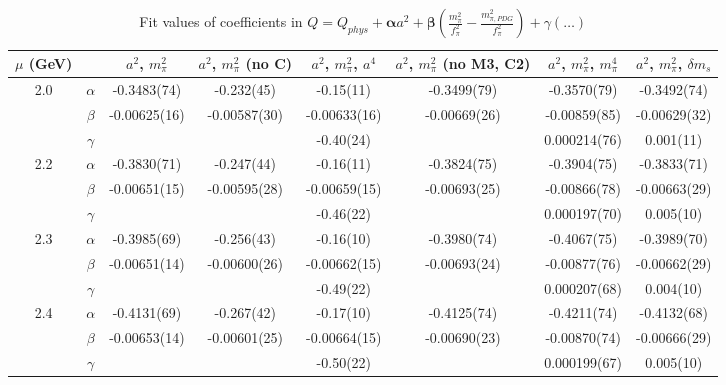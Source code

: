\documentclass[12pt]{extarticle}
\begin{document}
\begin{table}[h!]
\begin{center}
\begin{tabular}{|c c|c|c|c|c|c|c|}
\hline
$\mu$ (GeV) &  & $a^2$, $m_\pi^2$& $a^2$, $m_\pi^2$ (no C)& $a^2$, $m_\pi^2$, $a^4$& $a^2$, $m_\pi^2$ (no M3, C2)& $a^2$, $m_\pi^2$, $m_\pi^4$& $a^2$, $m_\pi^2$, $\delta m_s$\\
\hline
\multirow{3}{0.5in}{2.0} & $\alpha$ & -0.3483(74)& -0.232(45)& -0.15(11)& -0.3499(79)& -0.3570(79)& -0.3492(74)\\
 & $\beta$ & -0.00625(16)& -0.00587(30)& -0.00633(16)& -0.00669(26)& -0.00859(85)& -0.00629(32)\\
 & $\gamma$ &  &  & -0.40(24)&  & 0.000214(76)& 0.001(11)\\
\hline
\multirow{3}{0.5in}{2.2} & $\alpha$ & -0.3830(71)& -0.247(44)& -0.16(11)& -0.3824(75)& -0.3904(75)& -0.3833(71)\\
 & $\beta$ & -0.00651(15)& -0.00595(28)& -0.00659(15)& -0.00693(25)& -0.00866(78)& -0.00663(29)\\
 & $\gamma$ &  &  & -0.46(22)&  & 0.000197(70)& 0.005(10)\\
\hline
\multirow{3}{0.5in}{2.3} & $\alpha$ & -0.3985(69)& -0.256(43)& -0.16(10)& -0.3980(74)& -0.4067(75)& -0.3989(70)\\
 & $\beta$ & -0.00651(14)& -0.00600(26)& -0.00662(15)& -0.00693(24)& -0.00877(76)& -0.00662(29)\\
 & $\gamma$ &  &  & -0.49(22)&  & 0.000207(68)& 0.004(10)\\
\hline
\multirow{3}{0.5in}{2.4} & $\alpha$ & -0.4131(69)& -0.267(42)& -0.17(10)& -0.4125(74)& -0.4211(74)& -0.4132(68)\\
 & $\beta$ & -0.00653(14)& -0.00601(25)& -0.00664(15)& -0.00690(23)& -0.00870(74)& -0.00666(29)\\
 & $\gamma$ &  &  & -0.50(22)&  & 0.000199(67)& 0.005(10)\\
\hline
\end{tabular}
\caption{Fit values of coefficients in $Q = Q_{phys} + \mathbf{\alpha} a^2 + \mathbf{\beta}\left(\frac{m_\pi^2}{f_\pi^2}-\frac{m_{\pi,PDG}^2}{f_\pi^2}\right) + \gamma(\ldots)$}
\end{center}
\end{table}





\end{document}
